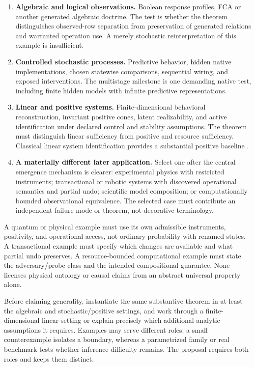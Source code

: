 \documentclass[11pt]{article}
\theoremstyle{remark}
\begin{document}
\begin{enumerate}
\item \textbf{Algebraic and logical observations.} Boolean response profiles, FCA or another generated algebraic doctrine. The test is whether the theorem distinguishes observed-row separation from preservation of generated relations and warranted operation use. A merely stochastic reinterpretation of this example is insufficient.
\item \textbf{Controlled stochastic processes.} Predictive behavior, hidden native implementations, chosen statewise comparisons, sequential wiring, and exposed interventions. The multistage milestone is one demanding native test, including finite hidden models with infinite predictive representations.
\item \textbf{Linear and positive systems.} Finite-dimensional behavioral reconstruction, invariant positive cones, latent realizability, and active identification under declared control and stability assumptions. The theorem must distinguish linear sufficiency from positive and resource sufficiency. Classical linear system identification provides a substantial positive baseline \cite{ActiveID}.
\item \textbf{A materially different later application.} Select one after the central emergence mechanism is clearer: experimental physics with restricted instruments; transactional or robotic systems with discovered operational semantics and partial undo; scientific model composition; or computationally bounded observational equivalence. The selected case must contribute an independent failure mode or theorem, not decorative terminology.
\end{enumerate}

A quantum or physical example must use its own admissible instruments, positivity, and operational access, not ordinary probability with renamed states. A transactional example must specify which changes are available and what partial undo preserves. A resource-bounded computational example must state the adversary/probe class and the intended compositional guarantee. None licenses physical ontology or causal claims from an abstract universal property alone.

Before claiming generality, instantiate the same substantive theorem in at least the algebraic and stochastic/positive settings, and work through a finite-dimensional linear setting or explain precisely which additional analytic assumptions it requires. Examples may serve different roles: a small counterexample isolates a boundary, whereas a parametrized family or real benchmark tests whether inference difficulty remains. The proposal requires both roles and keeps them distinct.
\end{document}
